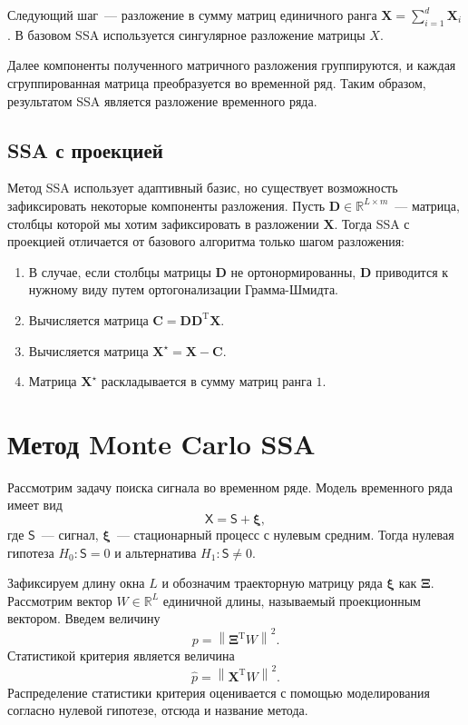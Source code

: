 \documentclass{math-mech-sci}
\begin{document}
Следующий шаг~--- разложение в сумму матриц единичного ранга $\mathbf{X}=\sum_{i=1}^d \mathbf{X}_i$. В базовом SSA используется сингулярное разложение матрицы ${X}$.

Далее компоненты полученного матричного разложения группируются, и каждая сгруппированная матрица преобразуется во временной ряд. Таким образом, результатом SSA является разложение временного ряда.

\subsection*{SSA с проекцией}
Метод SSA использует адаптивный базис, но существует возможность зафиксировать некоторые компоненты разложения. Пусть $\mathbf{D}\in\mathbb{R}^{L\times m}$~--- матрица, столбцы которой мы хотим зафиксировать в разложении $\mathbf{X}$. Тогда SSA с проекцией отличается от базового алгоритма только шагом разложения:
\begin{enumerate}
    \item В случае, если столбцы матрицы $\mathbf{D}$ не ортонормированны, $\mathbf{D}$ приводится к нужному виду путем ортогонализации Грамма-Шмидта.
    \item Вычисляется матрица $\mathbf{C}=\mathbf{D}\mathbf{D}^\mathrm{T}\mathbf{X}$.
    \item Вычисляется матрица $\mathbf{X}^\star=\mathbf{X}-\mathbf{C}$.
    \item Матрица $\mathbf{X}^\star$ раскладывается в сумму матриц ранга $1$.
\end{enumerate}

\section*{Метод Monte Carlo SSA}
Рассмотрим задачу поиска сигнала во временном ряде. Модель временного ряда имеет вид
\[
    \mathsf{X}=\mathsf{S} + \bm\xi,
\]
где $\mathsf{S}$~--- сигнал, $\bm\xi$~--- стационарный процесс с нулевым средним. Тогда нулевая гипотеза $H_0:\mathsf{S}=0$ и альтернатива $H_1:\mathsf{S}\ne0$.

Зафиксируем длину окна $L$ и обозначим траекторную матрицу ряда $\boldsymbol\xi$ как $\mathbf\Xi$. Рассмотрим вектор $W\in \mathbb R^L$ единичной длины, называемый проекционным вектором. Введем величину
\[
    p=\left\|\mathbf\Xi^{\mathrm{T}} W\right\|^2.
\]
Статистикой критерия является величина
\[
    \widehat p = \left\|{\mathbf{X}}^{\mathrm{T}} W\right\|^2.
\]
Распределение статистики критерия оценивается с помощью моделирования согласно нулевой гипотезе, отсюда и название метода.
\end{document}
